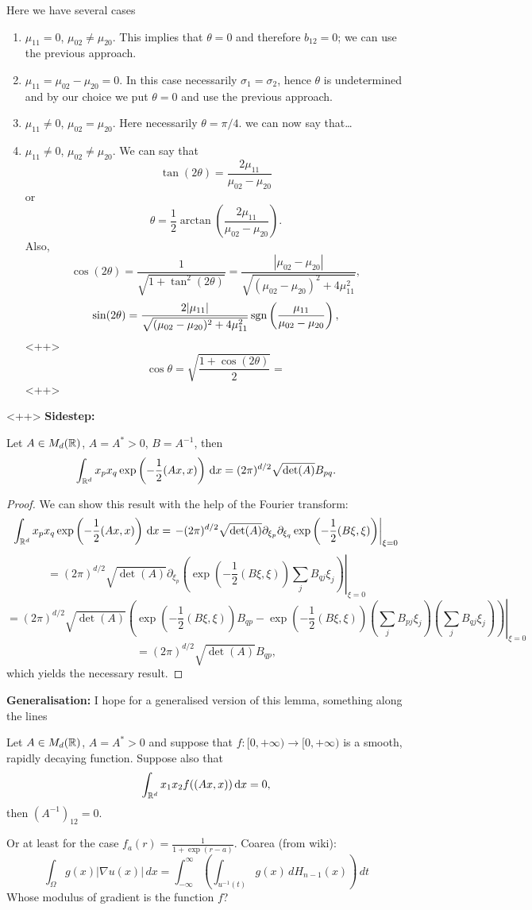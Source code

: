 \documentclass{article}
\begin{document}
Here we have several cases
\begin{enumerate}
	\item $\mu_{11}=0$, $\mu_{02}\ne \mu_{20}$. This implies that $\theta=0$ and therefore $b_{12}=0$; we can use the previous approach.
	\item $\mu_{11}=\mu_{02}-\mu_{20}=0$. In this case necessarily $\sigma_1=\sigma_2$, hence $\theta$ is undetermined and by our choice we put $\theta=0$ and use the previous approach.
	\item $\mu_{11}\ne0$, $\mu_{02}=\mu_{20}$. Here necessarily $\theta=\pi/4$. we can now say that\dots
	\item $\mu_{11}\ne0$, $\mu_{02}\ne\mu_{20}$. We can say that
		\[
			\tan (2\theta)=\frac{2\mu_{11}}{\mu_{02}-\mu_{20}}
		\]
		or
		\[
			\theta=\frac 12 \arctan\left( \frac{2\mu_{11}}{\mu_{02}-\mu_{20}} \right).
		\]
		Also,
		\[
			\cos (2	\theta)=\frac{1}{\sqrt{1+\tan^2(2\theta)}}=\frac{|\mu_{02}-\mu_{20}|}{\sqrt{(\mu_{02}-\mu_{20})^2+4\mu_{11}^2}},
		\]
		\[
			\sin(2\theta)=\frac{2|\mu_{11}|}{\sqrt{(\mu_{02}-\mu_{20})^2+4\mu_{11}^2}}\operatorname{sgn}\left( \frac{\mu_{11}}{\mu_{02}-\mu_{20}} \right),
		\]<++>
		\[
			\cos\theta = \sqrt{\frac{1+\cos(2\theta)}{2}}=
		\]<++>
\end{enumerate}<++>
\textbf{Sidestep: }
\begin{lemma}
	Let $A\in M_d({\mathbb R})$, $A=A^*>0$, $B=A^{-1}$, then
	\[
		\int_{{\mathbb R^d}}^{}x_px_q\exp\left(-\frac 12(Ax,x)\right){\,\mathrm{d} x}=(2\pi)^{d/2}\sqrt{\det(A)}B_{pq}.
	\]
	\label{le:cross:classic}
\end{lemma}
\begin{proof}
	We can show this result with the help of the Fourier transform:
	\[
		\int_{{\mathbb R^d}}^{}x_px_q\exp\left(-\frac{1}{2}(Ax,x)\right){\,\mathrm{d} x}=
		\left.-(2\pi)^{d/2}\sqrt{\det(A)}\partial_{\xi_p}\partial_{\xi_q} \exp\left(-\frac 12(B\xi,\xi)\right)\right|_{\xi=0}
	\]
	\[
		=\left.(2\pi)^{d/2}\sqrt{\det(A)}\partial_{\xi_p}\left(  \exp\left(-\frac 12(B\xi,\xi)\right)\sum_{j}B_{qj}\xi_j\right)\right|_{\xi=0}
	\]
\[
		=\left.(2\pi)^{d/2}\sqrt{\det(A)}\left(  \exp\left(-\frac 12(B\xi,\xi)\right)B_{qp}-\exp\left(-\frac 12(B\xi,\xi)\right)\left( \sum_{j}B_{pj}\xi_j \right)\left( \sum_{j}B_{qj}\xi_j \right)\right)\right|_{\xi=0}
\]
\[
	=(2\pi)^{d/2}\sqrt{\det(A)}B_{qp},
\]
which yields the necessary result.
\end{proof}
\textbf{Generalisation:} I hope for a generalised version of this lemma, something along the lines
\begin{lemma}
	Let $A\in M_d({\mathbb R})$, $A=A^*>0$ and suppose that $f:[0,+\infty)\to [0,+\infty)$ is a smooth, rapidly decaying function. Suppose also that
	\[
		\int_{{\mathbb R^d}}^{}x_1x_2f((Ax,x)){\,\mathrm{d} x}=0,
	\]
	then $ (A^{-1})_{12}=0$.
	\label{le:cross:hypothesis}
\end{lemma}
Or at least for the case $f_a(r)=\frac{1}{1+\exp(r-a)}$.
Coarea (from wiki):
\[
\int_\Omega g(x) |\nabla u(x)|\, dx = \int_{-\infty}^\infty \left(\int_{u^{-1}(t)}g(x)\,dH_{n-1}(x)\right)\,dt
\]
Whose modulus of gradient is the function $f$?
\end{document}

